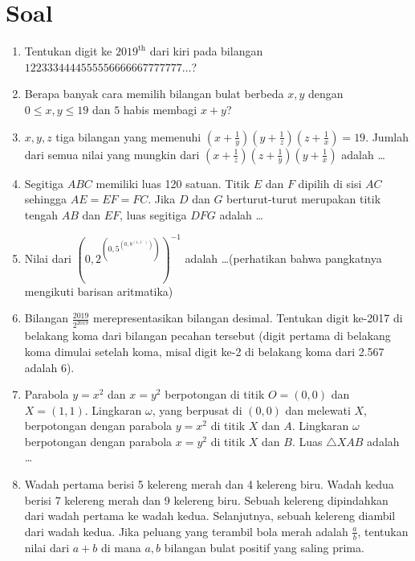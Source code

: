\documentclass[12pt]{scrartcl}
\begin{document}
\renewcommand*\contentsname{Daftar Isi}
\tableofcontents

\newpage

\section*{Soal}

\begin{enumerate}
    \item Tentukan digit ke $2019^{\text{th}}$ dari kiri pada bilangan $1223334444555556666667777777\dots$?
    
    \item Berapa banyak cara memilih bilangan bulat berbeda $x, y$ dengan $0 \le x, y \le 19$ dan $5$ habis membagi $x+y$?
    
    \item $x, y, z$ tiga bilangan yang memenuhi $(x+\frac{1}{y})(y+\frac{1}{z})(z+\frac{1}{x}) = 19$. Jumlah dari semua nilai yang mungkin dari $(x+\frac{1}{z})(z+\frac{1}{y})(y+\frac{1}{x})$ adalah \dots
    
    \item Segitiga $ABC$ memiliki luas 120 satuan. Titik $E$ dan $F$ dipilih di sisi $AC$ sehingga $AE=EF=FC$. Jika $D$ dan $G$ berturut-turut merupakan titik tengah $AB$ dan $EF$, luas segitiga $DFG$ adalah \dots
    
    \item Nilai dari $\left(0,2^{\left(0,5^{\left(0,8^{\left(1,1^{\dots}\right)}\right)}\right)}\right)^{-1}$ adalah \dots (perhatikan bahwa pangkatnya mengikuti barisan aritmatika)
    
    \item Bilangan $\frac{2019}{2^{2019}}$ merepresentasikan bilangan desimal. Tentukan digit ke-2017 di belakang koma dari bilangan pecahan tersebut (digit pertama di belakang koma dimulai setelah koma, misal digit ke-2 di belakang koma dari 2.567 adalah 6).
    
    \item Parabola $y=x^2$ dan $x=y^2$ berpotongan di titik $O=(0,0)$ dan $X=(1,1)$. Lingkaran $\omega$, yang berpusat di $(0,0)$ dan melewati $X$, berpotongan dengan parabola $y=x^2$ di titik $X$ dan $A$. Lingkaran $\omega$ berpotongan dengan parabola $x=y^2$ di titik $X$ dan $B$. Luas $\triangle XAB$ adalah \dots
    
    \item Wadah pertama berisi 5 kelereng merah dan 4 kelereng biru. Wadah kedua berisi 7 kelereng merah dan 9 kelereng biru. Sebuah kelereng dipindahkan dari wadah pertama ke wadah kedua. Selanjutnya, sebuah kelereng diambil dari wadah kedua. Jika peluang yang terambil bola merah adalah $\frac{a}{b}$, tentukan nilai dari $a+b$ di mana $a, b$ bilangan bulat positif yang saling prima.
    

\end{enumerate}
\end{document}

